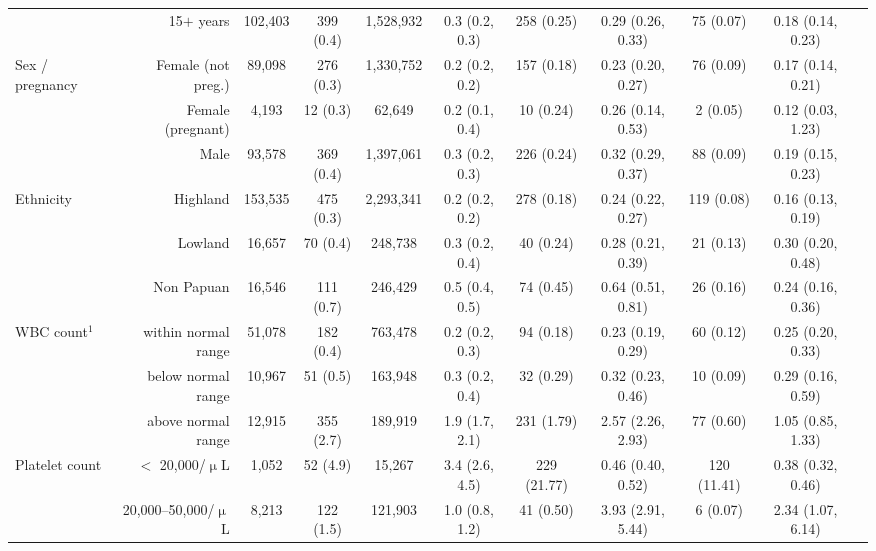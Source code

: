 \begin{landscape}
\begin{table}
\begin{tabular}{lrccccccccc}
								&	15$+$ years                	& 102,403      	&  399 (0.4)			 & 1,528,932 				& 0.3 (0.2, 0.3)  &  258 (0.25)   &  0.29 (0.26, 0.33)  &	 75 (0.07)   &  0.18 (0.14, 0.23)   \\    
Sex / pregnancy 				&	Female (not preg.)        	& 89,098    	&  276 (0.3)			 & 1,330,752 				& 0.2 (0.2, 0.2)  &  157 (0.18)   &  0.23 (0.20, 0.27)  &	 76 (0.09)   &  0.17 (0.14, 0.21)   \\	  
								&	Female (pregnant)         	& 4,193     	&   12 (0.3)			 & 62,649    				& 0.2 (0.1, 0.4)  &   10 (0.24)   &  0.26 (0.14, 0.53)  &	  2 (0.05)   &  0.12 (0.03, 1.23)   \\    
								&	Male                      	& 93,578    	&  369 (0.4)			 & 1,397,061 				& 0.3 (0.2, 0.3)  &  226 (0.24)   &  0.32 (0.29, 0.37)  &	 88 (0.09)   &  0.19 (0.15, 0.23)   \\    [3.5pt]
Ethnicity						&	Highland                  	& 153,535   	&  475 (0.3)			 & 2,293,341 				& 0.2 (0.2, 0.2)  &  278 (0.18)   &  0.24 (0.22, 0.27)  &	119 (0.08)   &  0.16 (0.13, 0.19)   \\    
								&	Lowland                   	& 16,657    	&   70 (0.4)			 & 248,738   				& 0.3 (0.2, 0.4)  &   40 (0.24)   &  0.28 (0.21, 0.39)  &	 21 (0.13)   &  0.30 (0.20, 0.48)   \\    
								&	Non Papuan                	& 16,546    	&  111 (0.7)			 & 246,429   				& 0.5 (0.4, 0.5)  &   74 (0.45)   &  0.64 (0.51, 0.81)  &	 26 (0.16)   &  0.24 (0.16, 0.36)   \\	  [3.5pt]
WBC count$^1$					&	within normal range       	& 51,078   		&  182 (0.4)			 & 763,478   				& 0.2 (0.2, 0.3)  &   94 (0.18)   &  0.23 (0.19, 0.29)  &	 60 (0.12)   &  0.25 (0.20, 0.33)   \\    
								&	below normal range        	& 10,967   		&   51 (0.5)			 & 163,948   				& 0.3 (0.2, 0.4)  &   32 (0.29)   &  0.32 (0.23, 0.46)  &	 10 (0.09)   &  0.29 (0.16, 0.59)   \\	  
								&	above normal range        	& 12,915   		&  355 (2.7)			 & 189,919   				& 1.9 (1.7, 2.1)  &  231 (1.79)   &  2.57 (2.26, 2.93)  &	 77 (0.60)   &  1.05 (0.85, 1.33)	 \\   [3.5pt]
Platelet count					&	$<$ 20,000/$\upmu$L         & 1,052    		&   52 (4.9)			 & 15,267    				& 3.4 (2.6, 4.5)  &  229 (21.77)   &  0.46 (0.40, 0.52)	&	120 (11.41)   &  0.38 (0.32, 0.46)   \\    
								&	20,000--50,000/$\upmu$L     & 8,213    		&  122 (1.5)			 & 121,903   				& 1.0 (0.8, 1.2)  &   41 (0.50)   &  3.93 (2.91, 5.44)  &	  6 (0.07)   &  2.34 (1.07, 6.14)   \\	  

\end{tabular}
\end{table}
\end{landscape}
